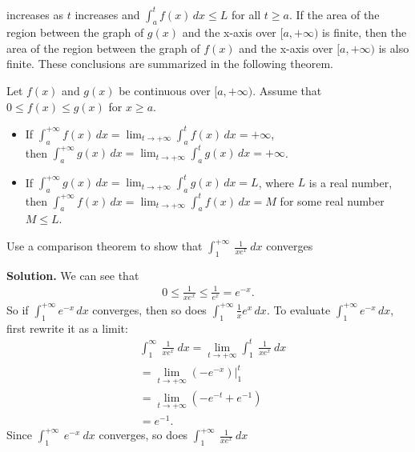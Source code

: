 \documentclass{report}
\begin{document}
        increases as $t$ increases and $\int_a^t f(x) \, dx \leq L$ for all $t \geq a$.
        \bigbreak \noindent 
        If the area of the region between the graph of $g(x)$ and the x-axis over $[a,+\infty)$ is finite, then the area of the region between the graph of $f(x)$ and the x-axis over $[a,+\infty)$ is also finite.
        These conclusions are summarized in the following theorem.
        \bigbreak \noindent 
        \begin{thrm}
            Let $f(x)$ and $g(x)$ be continuous over $[a,+\infty)$. Assume that $0 \leq f(x) \leq g(x)$ for $x \geq a$.
            \begin{itemize}
                \item If $\int_a^{+\infty} f(x) \, dx = \lim_{t \to +\infty} \int_a^t f(x) \, dx = +\infty$,  \\
                    then $\int_a^{+\infty} g(x) \, dx = \lim_{t \to +\infty} \int_a^t g(x) \, dx = +\infty$.
                \item If $\int_a^{+\infty} g(x) \, dx = \lim_{t \to +\infty} \int_a^t g(x) \, dx = L$, where $L$ is a real number,  \\
                    then $\int_a^{+\infty} f(x) \, dx = \lim_{t \to +\infty} \int_a^t f(x) \, dx = M$ for some real number $M \leq L$.
            \end{itemize}
        \end{thrm}

        \pagebreak \bigbreak \noindent 
        \begin{eg}
           Use a comparison theorem to show that $\int_{1}^{+\infty}\ \frac{1}{xe^{x}}\ dx $  converges
        \end{eg}
        \bigbreak \noindent 
        \textbf{Solution.} We can see that 
        \begin{align*}
            0 \leq \frac{1}{xe^{x}} \leq \frac{1}{e^{x}} =e^{-x}
        .\end{align*}
        So if $\int_1^{+\infty} e^{-x} \, dx$ converges, then so does $\int_1^{+\infty} \frac{1}{x} e^x \, dx$. To evaluate $\int_1^{+\infty} e^{-x} \, dx$, first rewrite it as a limit:
        \begin{align*}
            &\int_{1}^{\infty}\ \frac{1}{xe^{x}}\ dx = \lim\limits_{t \to +\infty}{\int_{1}^{t}\ \frac{1}{xe^{x}}\ dx} \\
            &= \lim\limits_{t \to +\infty}{(-e^{-x})}\bigg|_1^{t} \\
            &= \lim\limits_{t \to +\infty}{(-e^{-t} + e^{-1})} \\
            &= e^{-1}
        .\end{align*}
        \bigbreak \noindent 
        Since $\int_{1}^{+\infty}\ e^{-x}\ dx $ converges, so does $\int_{1}^{+\infty}\ \frac{1}{xe^{x}}\ dx $

        
        




        
        




        
        

        


        

        

        
\end{document}
